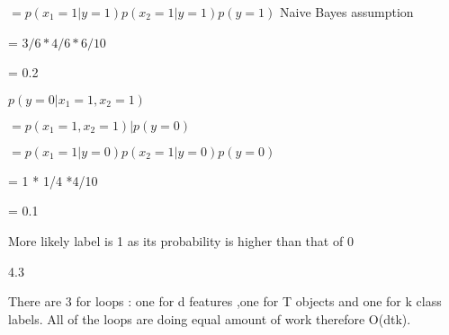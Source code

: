 \documentclass{article}
\def\gre#1{{\color{gre}#1}}
\def\red#1{{\color{red}#1}}
\begin{document}
\gre{$=p(x_1=1|y=1)p(x_2 = 1|y=1)p(y=1)$} \red {Naive Bayes assumption}

\gre{= $3/6*4/6*6/10$}

\gre{= 0.2}

\gre{$p(y = 0|x_1 = 1, x_2 = 1)$}

\gre{$=p(x_1 = 1, x_2 = 1)|p(y=0)$}

\gre{$=p(x_1=1|y=0)p(x_2 = 1|y=0)p(y=0)$}

\gre{= 1 * 1/4 *4/10}

\gre{= 0.1}

\gre{More likely label is 1 as its probability is higher than that of 0} 

\gre {4.3}

\gre{There are 3 for loops : one for d features ,one for T objects and one for k class labels.  All of the loops are doing equal amount of work therefore O(dtk).}
\end{document}
